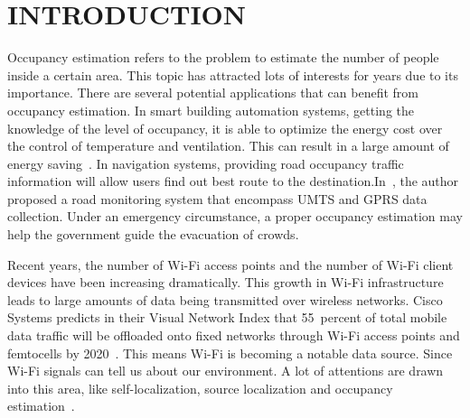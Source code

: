 \chapter[INTRODUCTION]{INTRODUCTION}
Occupancy estimation refers to the problem to estimate the number of people inside a certain area. 
This topic has attracted lots of interests for years due to its importance.
There are several potential applications that can benefit from occupancy estimation.
In smart building automation systems, getting the knowledge of the level of occupancy, it is able to optimize the energy cost over the control of temperature and ventilation.
This can result in a large amount of energy saving~\cite{Nguyen2013244,Balaji:2013:SOB:2517351.2517370}.
In navigation systems, providing road occupancy traffic information will allow users find out best route to the destination.In~\cite{5073548}, the author proposed a road monitoring system that encompass UMTS and GPRS data collection.
Under an emergency circumstance, a proper occupancy estimation may help the government guide the evacuation of crowds. 

Recent years, the number of Wi-Fi access points and the number of Wi-Fi client devices have been increasing dramatically. This growth in Wi-Fi infrastructure leads to large amounts of data being transmitted over wireless networks. Cisco Systems predicts in their Visual Network Index that 55~percent of total mobile data traffic will be offloaded onto fixed networks through Wi-Fi access points and femtocells by 2020~\cite{CiscoVNI2016}. This means Wi-Fi is becoming a notable data source. Since Wi-Fi signals can tell us about our environment. A lot of attentions are drawn into this area, like self-localization, source localization and occupancy estimation~\cite{Xu:2013:SID:2461381.2461394,6197192}.

